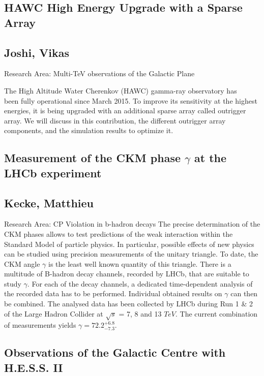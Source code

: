 \subsection*{\centering \large HAWC High Energy Upgrade with a Sparse Array}
\subsection*{\centering \normalsize Joshi, Vikas}
Research Area: Multi-TeV observations of the Galactic Plane\newline

\noindent The High Altitude Water Cherenkov (HAWC) gamma-ray observatory has\\been fully operational since March 2015. To improve its sensitivity at the highest energies, it is being upgraded with an additional sparse array called outrigger array. We will discuss in this contribution, the different outrigger array components, and the simulation results to optimize it.

\newpage

\subsection*{\centering \large Measurement of the CKM phase $\gamma$ at the LHCb experiment }
\subsection*{\centering \normalsize Kecke, Matthieu}
Research Area: CP Violation in b-hadron decays\newline
\noindent The precise determination of the CKM phases allows to test predictions of the weak interaction within the Standard Model of particle physics. In particular, possible effects of new physics can be studied using precision measurements of the unitary triangle. To date, the CKM angle $\gamma$ is the least well known quantity of this triangle. \newline
There is a multitude of B-hadron decay channels, recorded by LHCb, that are suitable to study $\gamma$. For each of the decay channels, a dedicated time-dependent analysis of the recorded data has to be performed. Individual obtained results on $\gamma$ can then be combined.
The analysed data has been collected by LHCb during Run 1 \& 2 of the Large Hadron Collider at $\sqrt{s}$ = 7, 8 and 13 $TeV$. The current combination of measurements yields $\gamma = 72.2^{+6.8}_{-7.3}$.

\subsection*{\centering \large Observations of the Galactic Centre with H.E.S.S. II}
